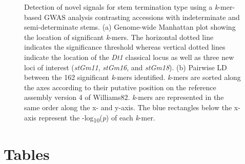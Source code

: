 \documentclass{article}
\begin{document}
\begin{figure}[p]
	\caption[Detection of novel signals for stem termination type
	using a \textit{k}-mer GWAS analysis contrasting accessions with
	indeterminate and semi-determinate stems]{Detection of novel signals for stem termination type
	using a \textit{k}-mer-based GWAS analysis contrasting accessions with
	indeterminate and semi-determinate stems.
	(a) Genome-wide Manhattan plot showing the location of significant \textit{k}-mers.
	The horizontal dotted line indicates the significance threshold
	whereas vertical dotted lines indicate the location of the \textit{Dt1}
	classical locus as well as three new loci of interest (\textit{stGm11},
	\textit{stGm16}, and \textit{stGm18}).
	(b) Pairwise LD between the 162 significant \textit{k}-mers identified.
	\textit{k}-mers are sorted along the axes according to their
	putative position on the reference assembly version 4 of Williams82.
	\textit{k}-mers are
	represented in the same order along the x- and y-axis. The blue
	rectangles below the x-axis represent the
	-log\textsubscript{10}(\textit{p}) of each \textit{k}-mer.}
	\label{stem-termination-main-figure}
\end{figure}


\section*{Tables}
\end{document}
